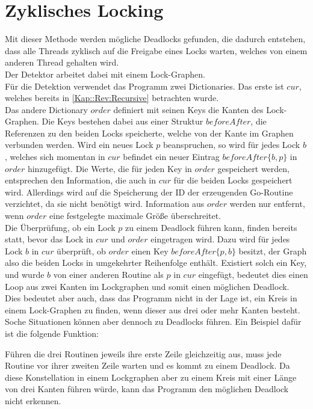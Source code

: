 \section{Zyklisches Locking}\label{Kap::Rev:Cyclic}
Mit dieser Methode werden mögliche Deadlocks gefunden, die dadurch entstehen,
dass alle Threads zyklisch auf die Freigabe eines Locks warten, welches von 
einem anderen Thread gehalten wird.\\ 
Der Detektor arbeitet dabei mit einem Lock-Graphen.\\
Für die Detektion verwendet das Programm zwei Dictionaries. Das erste ist $cur$, 
welches bereits in \ref{Kap::Rev:Recursive} betrachten wurde.\\
Das andere Dictionary $order$ definiert mit seinen Keys die Kanten des Lock-Graphen.
Die Keys bestehen dabei aus einer Struktur $beforeAfter$, die Referenzen zu den beiden
Locks speicherte, welche von der Kante im Graphen verbunden werden.
Wird ein neues Lock $p$ beanspruchen, so wird für 
jedes Lock $b$, welches sich momentan in $cur$ befindet ein  
neuer Eintrag $beforeAfter\{b, p\}$ in $order$ hinzugefügt. 
Die Werte, die für jeden Key in $order$ gespeichert werden, entsprechen 
den Information, die auch in $cur$ für die beiden Locks gespeichert wird. Allerdings 
wird auf die Speicherung der ID der erzeugenden Go-Routine verzichtet, da sie 
nicht benötigt wird.
Information aus $order$ werden nur entfernt, wenn $order$ eine festgelegte 
maximale Größe überschreitet.\\ 
Die Überprüfung, ob ein Lock $p$ zu einem Deadlock führen kann, finden bereits statt,
bevor das Lock in $cur$ und $order$ eingetragen wird. Dazu wird für jedes Lock
$b$ in $cur$ überprüft,
ob $order$ einen Key $beforeAfter\{p, b\}$ besitzt, der Graph also die beiden 
Locks in 
umgekehrter Reihenfolge enthält. Existiert solch ein Key, und wurde $b$ 
von einer anderen Routine als $p$ in $cur$ eingefügt, bedeutet dies einen 
Loop aus zwei Kanten im Lockgraphen und somit einen möglichen Deadlock.\\
Dies bedeutet aber auch, dass das Programm nicht in der Lage ist, ein Kreis 
in einem Lock-Graphen zu finden, wenn dieser aus drei oder mehr Kanten besteht.
Soche Situationen können aber dennoch zu Deadlocks führen. Ein Beispiel dafür 
ist die folgende Funktion:
\begin{figure}[H]
    
\end{figure}
Führen die drei Routinen jeweils ihre erste Zeile gleichzeitig aus, muss jede 
Routine vor ihrer zweiten Zeile warten und es kommt zu einem Deadlock. Da diese
Konstellation in einem Lockgraphen aber zu einem Kreis mit einer Länge von drei 
Kanten führen würde, kann das Programm den möglichen Deadlock nicht erkennen.\\

